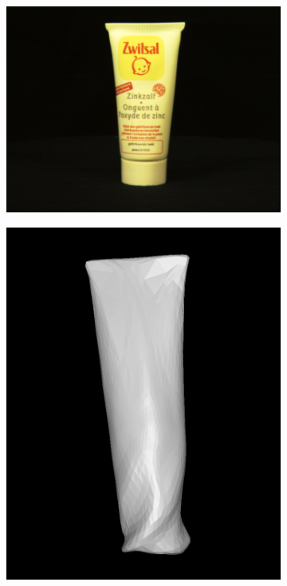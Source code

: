 \documentclass{article}
\begin{document}
\begin{figure}[h!]
  \centering
  \begin{subfigure}{.2\textwidth}
    \centering
    \includegraphics[width=\textwidth]{images/moisturiserpng.png}
    \caption{}
    \label{results-moisturiser-mesh1}
  \end{subfigure}
  \hfill
  \begin{subfigure}{.2\textwidth}
    \centering
    \includegraphics[width=\textwidth]{images/moistmesh_a.png}

\end{subfigure}
\end{figure}
\end{document}
